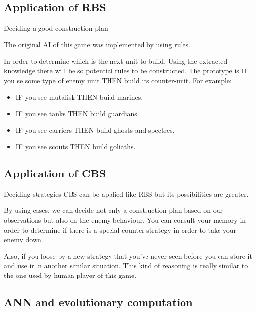 \documentclass[10pt]{beamer}
\begin{document}
\subsection{Application of RBS}

\begin{frame}{Deciding a good construction plan}

    The original AI of this game was implemented by using rules.
    \newline

    In order to determine which is the next unit to build. Using the extracted knowledge there will be so potential rules to be constructed. The prototype is IF you se some type of enemy unit THEN build its counter-unit. For example:

    \begin{itemize}
     \item IF you see mutalisk THEN build marines.
     \item IF you see tanks THEN build guardians.
     \item IF you see carriers THEN build ghosts and spectres.
     \item IF you see scouts THEN build goliaths.
    \end{itemize}
 
\end{frame}

\subsection{Application of CBS}

\begin{frame}{Deciding strategies}
 CBS can be applied like RBS but its possibilities are greater.
\newline

By using cases, we can decide not only a construction plan based on our observations but also on the enemy behaviour. You can consult your memory in order to determine if there is a special counter-strategy in order to take your enemy down.
\newline

Also, if you loose by a new strategy that you've never seen before you can store it and use ir in another similar situation. This kind of reasoning is really similar to the one used by human player of this game.
\end{frame}

\subsection{ANN and evolutionary computation}
\end{document}
